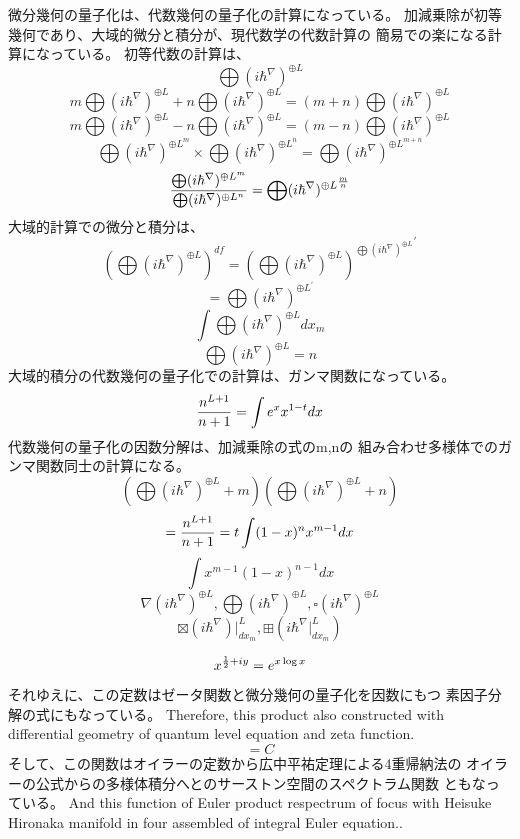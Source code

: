 \documentclass{jsarticle}
\begin{document}
  微分幾何の量子化は、代数幾何の量子化の計算になっている。
  加減乗除が初等幾何であり、大域的微分と積分が、現代数学の代数計算の
  簡易での楽になる計算になっている。
  初等代数の計算は、
  $$ \bigoplus({i \hbar^{\nabla}})^{\oplus L} $$
   $$m \bigoplus({i \hbar^{\nabla}})^{\oplus L} +  
   n\bigoplus({i \hbar^{\nabla}})^{\oplus L} = 
   (m+n) \bigoplus({i \hbar^{\nabla}})^{\oplus L}   $$
   $$ m\bigoplus({i \hbar^{\nabla}})^{\oplus L} -  
   n\bigoplus({i \hbar^{\nabla}})^{\oplus L} = 
   (m-n) \bigoplus({i \hbar^{\nabla}})^{\oplus L}   $$
   $$ \bigoplus({i \hbar^{\nabla}})^{{\oplus L}^m} \times 
      \bigoplus({i \hbar^{\nabla}})^{{\oplus L}^n} =
   \bigoplus({i \hbar^{\nabla}})^{\oplus L^{m+n}} $$
  $$ {{\bigoplus({i \hbar^{\nabla}})^{\oplus L^m}}  \over  
  {\bigoplus({i \hbar^{\nabla}})^{\oplus L^n}}} =  
  \bigoplus({i \hbar^{\nabla}})^{\oplus L^{m\over n}} $$
  大域的計算での微分と積分は、
  $$ \left(\bigoplus({i \hbar^{\nabla}})^{\oplus L}\right)^{df}
  =  {\left(\bigoplus({i \hbar^{\nabla}})^{\oplus L}\right)^{
	  \bigoplus({i \hbar^{\nabla}})^{\oplus L}}}^{'}  $$
  $$ = \bigoplus({i \hbar^{\nabla}})^{\oplus L^{'}} $$
   $$ \int \bigoplus({i \hbar^{\nabla}})^{\oplus L} dx_m $$
   $$ \bigoplus({i \hbar^{\nabla}})^{\oplus L} = n $$
   大域的積分の代数幾何の量子化での計算は、ガンマ関数になっている。
   $$ {n^{L+1} \over {n+1}} = \int e^x x^{1 - t} dx $$
   代数幾何の量子化の因数分解は、加減乗除の式のm,nの
   組み合わせ多様体でのガンマ関数同士の計算になる。
   $$ \left(\bigoplus({i \hbar^{\nabla}})^{\oplus L}+m\right) 
   \left(\bigoplus({i \hbar^{\nabla}})^{\oplus L}+n\right) $$
  $$ = {n^{L+1} \over {n+1}} = t \int (1 - x)^n x^{m - 1} dx $$
  $$ \int x^{m-1}(1 - x)^{n-1} dx $$
  $$ \nabla ({i \hbar^{\nabla}})^{\oplus L}, \bigoplus ({i \hbar^{\nabla}})^{
	   \oplus L}, \square ({i \hbar^{\nabla}})^{\oplus L} $$
   $$ \boxtimes (i \hbar^{\nabla})|_{dx_m}^L, \boxplus (i \hbar^{\nabla}|_
   {dx_m}^L) $$



  $$ x^{{1 \over 2} + iy} = e^{x \log x} $$
  それゆえに、この定数はゼータ関数と微分幾何の量子化を因数にもつ
  素因子分解の式にもなっている。
  Therefore, this product also constructed with differential geometry
  of quantum level equation and zeta function.
  $$ = C $$ 
  そして、この関数はオイラーの定数から広中平祐定理による4重帰納法の
  オイラーの公式からの多様体積分へとのサーストン空間のスペクトラム関数
  ともなっている。
  And this function of Euler product respectrum of focus with
  Heisuke Hironaka manifold in four assembled of integral Euler equation.. 
\end{document}
